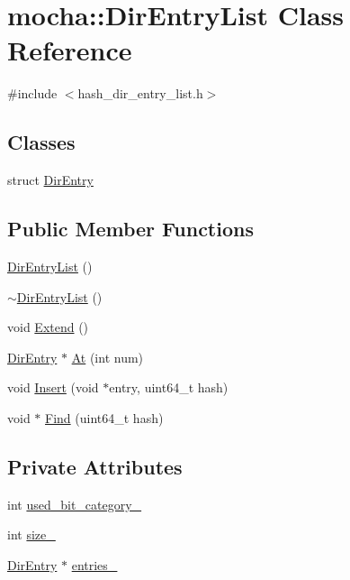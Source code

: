 \hypertarget{classmocha_1_1_dir_entry_list}{
\section{mocha::DirEntryList Class Reference}
\label{classmocha_1_1_dir_entry_list}
}


{\ttfamily \#include $<$hash\_\-dir\_\-entry\_\-list.h$>$}

\subsection*{Classes}
\begin{DoxyCompactItemize}
\item 
struct \hyperlink{structmocha_1_1_dir_entry_list_1_1_dir_entry}{DirEntry}
\end{DoxyCompactItemize}
\subsection*{Public Member Functions}
\begin{DoxyCompactItemize}
\item 
\hyperlink{classmocha_1_1_dir_entry_list_a3f5e423097367d99de8440f1d49b62ac}{DirEntryList} ()
\item 
\hyperlink{classmocha_1_1_dir_entry_list_a942ffaddcb496934dc056dfaeba31796}{$\sim$DirEntryList} ()
\item 
void \hyperlink{classmocha_1_1_dir_entry_list_aa48c3c866978aca3bec78981afaf11c2}{Extend} ()
\item 
\hyperlink{structmocha_1_1_dir_entry_list_1_1_dir_entry}{DirEntry} $\ast$ \hyperlink{classmocha_1_1_dir_entry_list_a2428aac7ddc43862719b1e9fcf7d1e92}{At} (int num)
\item 
void \hyperlink{classmocha_1_1_dir_entry_list_a456848a7ec9c9e36f91676ab3d534fc4}{Insert} (void $\ast$entry, uint64\_\-t hash)
\item 
void $\ast$ \hyperlink{classmocha_1_1_dir_entry_list_acd2ebff8120c7384f6974a42bfc2c500}{Find} (uint64\_\-t hash)
\end{DoxyCompactItemize}
\subsection*{Private Attributes}
\begin{DoxyCompactItemize}
\item 
int \hyperlink{classmocha_1_1_dir_entry_list_a498e86857a21dbeabab021c7a9621d9f}{used\_\-bit\_\-category\_\-}
\item 
int \hyperlink{classmocha_1_1_dir_entry_list_a7b9617a781ff4f9c0572db72139cb590}{size\_\-}
\item 
\hyperlink{structmocha_1_1_dir_entry_list_1_1_dir_entry}{DirEntry} $\ast$ \hyperlink{classmocha_1_1_dir_entry_list_a3d34a72036ac78b8d9531da25a999006}{entries\_\-}
\end{DoxyCompactItemize}



